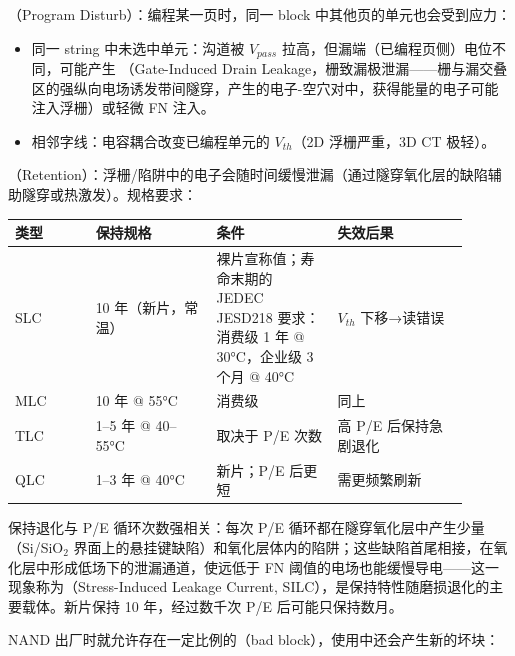 

（Program Disturb）：编程某一页时，同一 block 中其他页的单元也会受到应力：
\begin{itemize}
  \item 同一 string 中未选中单元：沟道被 $V_{pass}$ 拉高，但漏端（已编程页侧）电位不同，可能产生 （Gate-Induced Drain Leakage，栅致漏极泄漏——栅与漏交叠区的强纵向电场诱发带间隧穿，产生的电子-空穴对中，获得能量的电子可能注入浮栅）或轻微 FN 注入。
  \item 相邻字线：电容耦合改变已编程单元的 $V_{th}$（2D 浮栅严重，3D CT 极轻）。
\end{itemize}

（Retention）：浮栅/陷阱中的电子会随时间缓慢泄漏（通过隧穿氧化层的缺陷辅助隧穿或热激发）。规格要求：

\begin{longtable}{L{0.16\linewidth}L{0.24\linewidth}L{0.24\linewidth}L{0.26\linewidth}}
\toprule
类型 & 保持规格 & 条件 & 失效后果 \\
\midrule
SLC & 10 年（新片，常温） & 裸片宣称值；寿命末期的 JEDEC JESD218 要求：消费级 1 年 @ 30°C，企业级 3 个月 @ 40°C & $V_{th}$ 下移→读错误 \\
MLC & 10 年 @ 55°C & 消费级 & 同上 \\
TLC & 1--5 年 @ 40--55°C & 取决于 P/E 次数 & 高 P/E 后保持急剧退化 \\
QLC & 1--3 年 @ 40°C & 新片；P/E 后更短 & 需更频繁刷新 \\
\bottomrule
\end{longtable}

保持退化与 P/E 循环次数强相关：每次 P/E 循环都在隧穿氧化层中产生少量（Si/SiO$_2$ 界面上的悬挂键缺陷）和氧化层体内的陷阱；这些缺陷首尾相接，在氧化层中形成低场下的泄漏通道，使远低于 FN 阈值的电场也能缓慢导电——这一现象称为（Stress-Induced Leakage Current, SILC），是保持特性随磨损退化的主要载体。新片保持 10 年，经过数千次 P/E 后可能只保持数月。


NAND 出厂时就允许存在一定比例的（bad block），使用中还会产生新的坏块：

